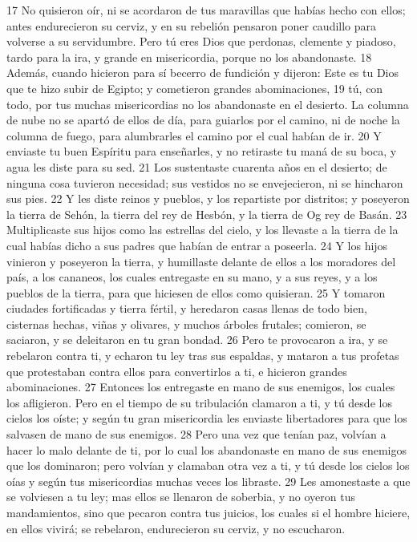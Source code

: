 17 No quisieron oír, ni se acordaron de tus maravillas que habías hecho con ellos; antes endurecieron su cerviz, y en su rebelión pensaron poner caudillo para volverse a su servidumbre. Pero tú eres Dios que perdonas, clemente y piadoso, tardo para la ira, y grande en misericordia, porque no los abandonaste.
18 Además, cuando hicieron para sí becerro de fundición y dijeron: Este es tu Dios que te hizo subir de Egipto; y cometieron grandes abominaciones,
19 tú, con todo, por tus muchas misericordias no los abandonaste en el desierto. La columna de nube no se apartó de ellos de día, para guiarlos por el camino, ni de noche la columna de fuego, para alumbrarles el camino por el cual habían de ir.
20 Y enviaste tu buen Espíritu para enseñarles, y no retiraste tu maná de su boca, y agua les diste para su sed.
21 Los sustentaste cuarenta años en el desierto; de ninguna cosa tuvieron necesidad; sus vestidos no se envejecieron, ni se hincharon sus pies. 
22 Y les diste reinos y pueblos, y los repartiste por distritos; y poseyeron la tierra de Sehón, la tierra del rey de Hesbón, y la tierra de Og rey de Basán. 
23 Multiplicaste sus hijos como las estrellas del cielo, y los llevaste a la tierra de la cual habías dicho a sus padres que habían de entrar a poseerla. 
24 Y los hijos vinieron y poseyeron la tierra, y humillaste delante de ellos a los moradores del país, a los cananeos, los cuales entregaste en su mano, y a sus reyes, y a los pueblos de la tierra, para que hiciesen de ellos como quisieran. 
25 Y tomaron ciudades fortificadas y tierra fértil, y heredaron casas llenas de todo bien, cisternas hechas, viñas y olivares, y muchos árboles frutales; comieron, se saciaron, y se deleitaron en tu gran bondad. 
26 Pero te provocaron a ira, y se rebelaron contra ti, y echaron tu ley tras sus espaldas, y mataron a tus profetas que protestaban contra ellos para convertirlos a ti, e hicieron grandes abominaciones.
27 Entonces los entregaste en mano de sus enemigos, los cuales los afligieron. Pero en el tiempo de su tribulación clamaron a ti, y tú desde los cielos los oíste; y según tu gran misericordia les enviaste libertadores para que los salvasen de mano de sus enemigos.
28 Pero una vez que tenían paz, volvían a hacer lo malo delante de ti, por lo cual los abandonaste en mano de sus enemigos que los dominaron; pero volvían y clamaban otra vez a ti, y tú desde los cielos los oías y según tus misericordias muchas veces los libraste. 
29 Les amonestaste a que se volviesen a tu ley; mas ellos se llenaron de soberbia, y no oyeron tus mandamientos, sino que pecaron contra tus juicios, los cuales si el hombre hiciere, en ellos vivirá; se rebelaron, endurecieron su cerviz, y no escucharon.
